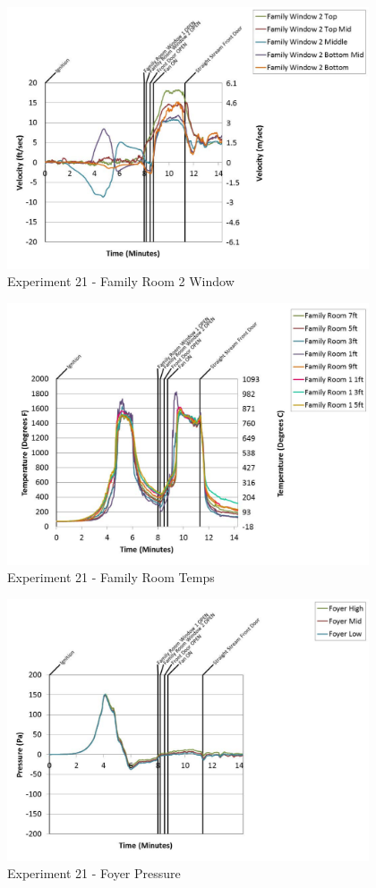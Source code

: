 \documentclass{article}
\begin{document}
\begin{appendices}
	\clearpage

	\begin{figure}[h!]
		\centering
		\includegraphics[height=3.05in]{0_Images/Results_Charts/Exp_21_Charts/FamilyRoom2Window.pdf}
		\caption{Experiment 21 - Family Room 2 Window}
	\end{figure}
 

	\begin{figure}[h!]
		\centering
		\includegraphics[height=3.05in]{0_Images/Results_Charts/Exp_21_Charts/FamilyRoomTemps.pdf}
		\caption{Experiment 21 - Family Room Temps}
	\end{figure}
 
	\clearpage

	\begin{figure}[h!]
		\centering
		\includegraphics[height=3.05in]{0_Images/Results_Charts/Exp_21_Charts/FoyerPressure.pdf}
		\caption{Experiment 21 - Foyer Pressure}
	\end{figure}
 


\end{appendices}
\end{document}
